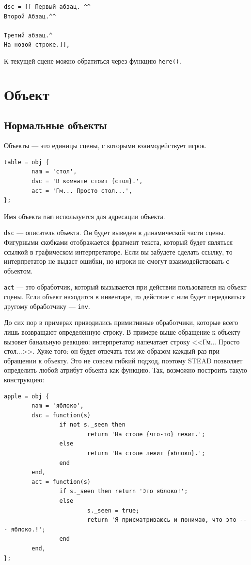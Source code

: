 \documentclass[a4paper,12pt]{article}
\begin{document}
\begin{verbatim}
dsc = [[ Первый абзац. ^^
Второй Абзац.^^

Третий абзац.^
На новой строке.]],
\end{verbatim}

К текущей сцене можно обратиться через функцию \verb/here()/.

\section{Объект}
\subsection{Нормальные объекты}
Объекты --- это единицы сцены, с которыми взаимодействует игрок.

\begin{verbatim}
table = obj {
        nam = 'стол',
        dsc = 'В комнате стоит {стол}.',
        act = 'Гм... Просто стол...',
};
\end{verbatim}

Имя объекта \verb/nam/ используется для адресации объекта.

\verb/dsc/ --- описатель объекта. Он будет выведен в динамической части сцены. Фигурными скобками отображается фрагмент текста, который будет являться ссылкой в графическом интерпретаторе. Если вы забудете сделать ссылку, то интерпретатор не выдаст ошибки, но игроки не смогут взаимодействовать с объектом.

\index{Атрибуты!act}
\verb/act/ --- это обработчик, который вызывается при действии пользователя на объект сцены. Если объект находится в инвентаре, то действие с ним будет передаваться другому обработчику --- \verb/inv/.

До сих пор в примерах приводились примитивные обработчики, которые всего лишь возвращают определённую строку. В примере выше обращение к объекту вызовет банальную реакцию: интерпретатор напечатает строку <<Гм... Просто стол...>>. Хуже того: он будет отвечать тем же образом каждый раз при обращении к объекту. Это не совсем гибкий подход, поэтому STEAD позволяет определить любой атрибут объекта как функцию. Так, возможно построить такую конструкцию:

\begin{verbatim}
apple = obj {
        nam = 'яблоко',
        dsc = function(s)
                if not s._seen then
                        return 'На столе {что-то} лежит.';
                else
                        return 'На столе лежит {яблоко}.';
                end
        end,
        act = function(s)
                if s._seen then return 'Это яблоко!';
                else
                        s._seen = true;
                        return 'Я присматриваюсь и понимаю, что это --- яблоко.!';
                end
        end,
};
\end{verbatim}
\end{document}
